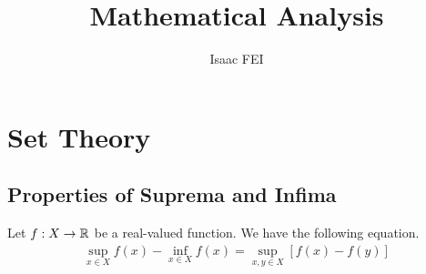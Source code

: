 \documentclass[thmcnt=section, 12pt]{my-elegantbook}
\title{Mathematical Analysis}
\author{Isaac FEI}
\begin{document}
\maketitle





\frontmatter
\tableofcontents
\mainmatter



\chapter{Set Theory}


\section{Properties of Suprema and Infima}

\begin{theorem} \label{thm:27}
    Let $f: X \to \mathbb{R}$ be a real-valued function. We have the following equation.
    \begin{align}
        \sup_{x \in X} f(x) - \inf_{x \in X} f(x)
        = \sup_{x,y \in X} [f(x) - f(y)]
        \label{eq:66}
    \end{align}
\end{theorem}
\end{document}

